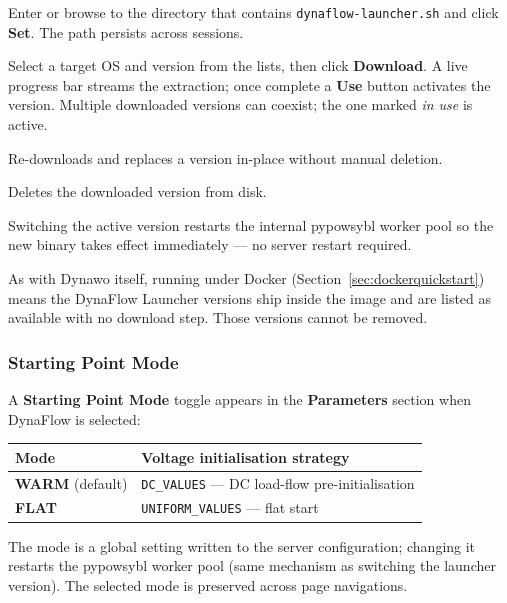 \documentclass[a4paper,11pt]{article}
\newcommand{\code}[1]{\texttt{\small #1}}
\begin{document}
\begin{description}[leftmargin=2em]
  \item[\textbf{Path field}] Enter or browse to the directory that contains
    \code{dynaflow-launcher.sh} and click \textbf{Set}. The path persists across
    sessions.
  \item[\textbf{Download}] Select a target OS and version from the lists, then
    click \textbf{Download}. A live progress bar streams the extraction; once
    complete a \textbf{Use} button activates the version. Multiple downloaded
    versions can coexist; the one marked \emph{in use} is active.
  \item[\textbf{Update}] Re-downloads and replaces a version in-place without
    manual deletion.
  \item[\textbf{Remove}] Deletes the downloaded version from disk.
\end{description}

Switching the active version restarts the internal pypowsybl worker pool so the
new binary takes effect immediately --- no server restart required.

\begin{notebox}
As with Dynawo itself, running under Docker
(Section~\ref{sec:dockerquickstart}) means the DynaFlow Launcher versions ship
inside the image and are listed as available with no download step. Those
versions cannot be removed.
\end{notebox}

\subsubsection{Starting Point Mode}
\label{sec:startingpoint}

A \textbf{Starting Point Mode} toggle appears in the \textbf{Parameters} section
when DynaFlow is selected:

\begin{center}
\begin{tabularx}{0.6\linewidth}{lX}
\toprule
\textbf{Mode} & \textbf{Voltage initialisation strategy} \\
\midrule
\textbf{WARM} (default) & \code{DC\_VALUES} --- DC load-flow pre-initialisation \\
\textbf{FLAT}           & \code{UNIFORM\_VALUES} --- flat start \\
\bottomrule
\end{tabularx}
\end{center}

The mode is a global setting written to the server configuration; changing it
restarts the pypowsybl worker pool (same mechanism as switching the launcher
version). The selected mode is preserved across page navigations.
\end{document}

